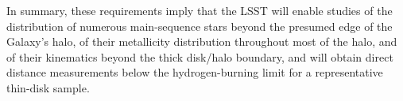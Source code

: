 In summary, these requirements imply that the LSST will enable studies of the
distribution of numerous main-sequence stars beyond the presumed edge of
the Galaxy's halo, of their metallicity distribution throughout most of the
halo, and of their kinematics beyond the thick disk/halo boundary, and will
obtain direct distance measurements below the hydrogen-burning limit for a
representative thin-disk sample.
